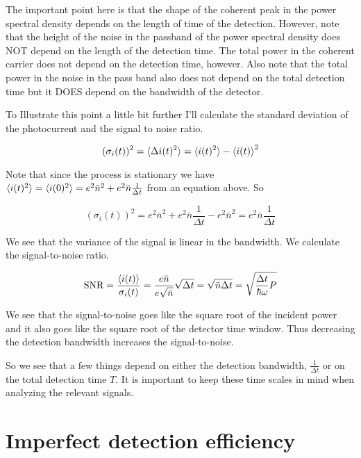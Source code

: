 \documentclass[12pt]{article}
\begin{document}
The important point here is that the shape of the coherent peak in the power spectral density depends on the length of time of the detection. However, note that the height of the noise in the passband of the power spectral density does NOT depend on the length of the detection time. The total power in the coherent carrier does not depend on the detection time, however. Also note that the total power in the noise in the pass band also does not depend on the total detection time but it DOES depend on the bandwidth of the detector.

To Illustrate this point a little bit further I'll calculate the standard deviation of the photocurrent and the signal to noise ratio.

\begin{equation}
(\sigma_i(t))^2 = \braket{\Delta i(t)^2} = \braket{i(t)^2}-\braket{i(t)}^2
\end{equation}

Note that since the process is stationary we have $\braket{i(t)^2} = \braket{i(0)^2} = e^2 \bar{n}^2 + e^2 \bar{n}\frac{1}{\Delta t}$ from an equation above. So

\begin{equation}
(\sigma_i(t))^2 = e^2 \bar{n}^2 + e^2 \bar{n} \frac{1}{\Delta t}-e^2 \bar{n}^2 = e^2 \bar{n}\frac{1}{\Delta t}
\end{equation}

We see that the variance of the signal is linear in the bandwidth. We calculate the signal-to-noise ratio.

\begin{equation}
\text{SNR} = \frac{\braket{i(t)}}{\sigma_i(t)} = \frac{e\bar{n}}{e \sqrt{\bar{n}}} \sqrt{\Delta t} = \sqrt{\bar{n} \Delta t} = \sqrt{\frac{\Delta{t}}{\hbar \omega} P}
\end{equation}

We see that the signal-to-noise goes like the square root of the incident power and it also goes like the square root of the detector time window. Thus decreasing the detection bandwidth increases the signal-to-noise.

So we see that a few things depend on either the detection bandwidth, $\frac{1}{\Delta t}$ or on the total detection time $T$. It is important to keep these time scales in mind when analyzing the relevant signals.

\section{Imperfect detection efficiency}
\end{document}
